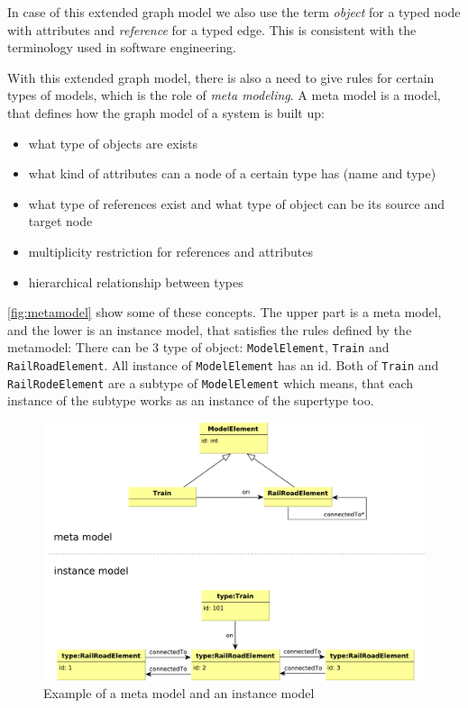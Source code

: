 In case of this extended graph model we also use the term \emph{object} for a typed node with attributes and \emph{reference} for a typed edge. This is consistent with the terminology used in software engineering.

With this extended graph model, there is also a need to give rules for certain types of models, which is the role of \emph{meta modeling}.
A meta model is a model, that defines how the graph model of a system is built up:
\begin{itemize}
	\item what type of objects are exists
	\item what kind of attributes can a node of a certain type has (name and type)
	\item what type of references exist and what type of object can be its source and target node
	\item multiplicity restriction for references and attributes
	\item hierarchical relationship between types
\end{itemize}

\autoref{fig:metamodel} show some of these concepts. The upper part is a meta model, and the lower is an instance model, that satisfies the rules defined by the metamodel: There can be 3 type of object: \texttt{ModelElement}, \texttt{Train} and \texttt{RailRoadElement}. All instance of \texttt{ModelElement} has an id. Both of \texttt{Train} and \texttt{RailRodeElement} are a subtype of \texttt{ModelElement} which means, that each instance of the subtype works as an instance of the supertype too.
\begin{figure}[h]
	\begin{center}
		\includegraphics[width=\textwidth]{figures/metamodel.pdf}
		\caption{ Example of a meta model and an instance model }
		\label{fig:metamodel}
	\end{center}
\end{figure}


